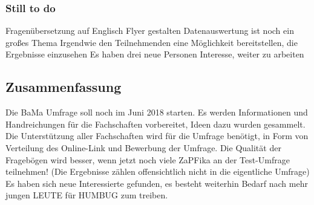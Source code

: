 
      \subsubsection*{Still to do}
        \begin{outline}
          \1 Fragenübersetzung auf Englisch
          \1 Flyer gestalten
          \1 Datenauswertung ist noch ein großes Thema
            \2 Irgendwie den Teilnehmenden eine Möglichkeit bereitstellen, die Ergebnisse einzusehen
          \1 Es haben drei neue Personen Interesse, weiter zu arbeiten
        \end{outline}

  \subsection*{Zusammenfassung}
    \begin{outline}
      \1 Die BaMa Umfrage soll noch im Juni 2018 starten.
      \1 Es werden Informationen und Handreichungen für die Fachschaften vorbereitet, Ideen dazu wurden gesammelt.
      \1 Die Unterstützung aller Fachschaften wird für die Umfrage benötigt, in Form von Verteilung des Online-Link und Bewerbung der Umfrage.
      \1 Die Qualität der Fragebögen wird besser, wenn jetzt noch viele ZaPFika an der Test-Umfrage teilnehmen! (Die Ergebnisse zählen offensichtlich nicht in die eigentliche Umfrage)
      \1 Es haben sich neue Interessierte gefunden, es besteht weiterhin Bedarf nach mehr jungen LEUTE für HUMBUG zum treiben.
    \end{outline}
